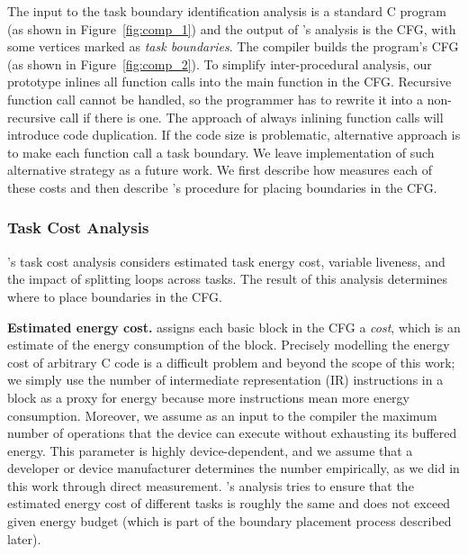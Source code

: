The input to the task boundary identification analysis is a standard C program (as shown in Figure~\ref{fig:comp_1}) and the output of \sys's analysis is the CFG, with some vertices marked as {\em task boundaries}. The \sys compiler builds the program's CFG (as shown in
Figure~\ref{fig:comp_2}). To simplify inter-procedural analysis, our prototype inlines all function calls into the main function in the CFG. Recursive function call cannot be handled, so the programmer has to rewrite it into a non-recursive call if there is one. The approach of always inlining function calls will introduce code duplication. If the code size is problematic, alternative approach is to make each function call a task boundary. We leave implementation of such alternative strategy as a future work.
%
%
We first describe how \sys measures each of these costs and then describe \sys's procedure for placing boundaries in the CFG.

\subsubsection{Task Cost Analysis}

\sys's task cost analysis considers estimated task energy cost, variable liveness, and the impact of splitting loops across tasks. The result of this analysis determines where to place boundaries in the CFG.
 
{\noindent \bf Estimated energy cost.} \sys assigns each basic block in the CFG a {\em cost}, which is an estimate of the energy consumption of the block. Precisely modelling the energy cost of arbitrary C code is a difficult problem and beyond the scope of this work; we simply use the number of intermediate representation (IR) instructions in a block as a proxy for energy because more instructions mean more energy consumption. Moreover, we assume as an input to the compiler the maximum number of operations that the device can execute without exhausting its buffered energy. This parameter is highly device-dependent, and we assume that a developer or device manufacturer determines the number empirically, as we did in this work through direct measurement. \sys's analysis tries to ensure that the estimated energy cost of different tasks is roughly the same and does not exceed given energy budget (which is part of the boundary placement process described later).

